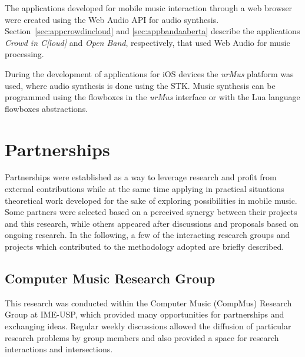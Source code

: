 The applications developed for mobile music interaction through a web browser were created using the Web Audio API for audio synthesis.
Section~\ref{sec:appcrowdincloud} and \ref{sec:appbandaaberta} describe the applications \textit{Crowd in C[loud]} and \textit{Open Band}, respectively, that used Web Audio for music processing.

During the development of applications for iOS devices the \textit{urMus} platform was used, where audio synthesis is done using the STK.
Music synthesis can be programmed using the flowboxes in the \textit{urMus} interface or with the Lua language flowboxes abstractions.


\section{Partnerships}
\label{sec:partnerships}
Partnerships were established as a way to leverage research and profit from external contributions while at the same time applying in practical situations theoretical work developed for the sake of exploring possibilities in mobile music.
Some partners were selected based on a perceived synergy between their projects and this research, while others appeared after discussions and proposals based on ongoing research. In the following, a few of the interacting research groups and projects which contributed to the methodology adopted are briefly described.

\subsection*{Computer Music Research Group}
This research was conducted within the Computer Music (CompMus) Research Group at IME-USP, which provided many opportunities for partnerships and exchanging ideas.
Regular weekly discussions allowed the diffusion of particular research problems by group members and also provided a space for research interactions and intersections.

